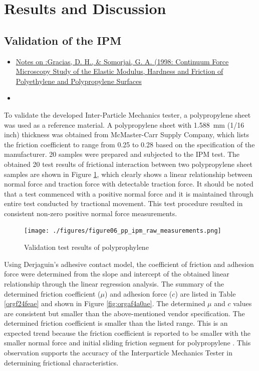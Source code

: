 \documentclass[xcolor=dvipsnames,10pt,hidelinks]{article}
\let\oldsubsection\subsection
\renewcommand{\subsection}{\clearpage\oldsubsection}
\begin{document}
\section{Results and Discussion}
\label{sec:orgdabf9c7}
\subsection{Validation of the IPM}
\label{sec:orga44eba8}
\begin{itemize}
\item \parencite{gracias_continuum_1998}\href{../../../../../org/mindmap/gracias_continuum_1998.org}{Notes on :Gracias, D. H., \& Somorjai, G. A. (1998: Continuum Force Microscopy Study of the Elastic Modulus, Hardness and Friction of Polyethylene and Polypropylene Surfaces}
\item 
\end{itemize}

To validate the developed Inter-Particle Mechanics tester, a polypropylene sheet was used as a reference material.
A polypropylene sheet with \qty{1.588}{\milli\meter} (1/16 inch) thickness was obtained from McMaster-Carr Supply Company,
which lists the friction coefficient to range from 0.25 to 0.28 based on the specification of the manufacturer.
20 samples were prepared and subjected to the IPM test.
The obtained 20 test results of frictional interaction between two polypropylene sheet samples are shown in Figure \ref{fig:org810e84b},
which clearly shows a linear relationship between normal force and traction force with detectable traction force.
It should be noted that a test commenced with a positive normal force and it is maintained through entire test conducted by tractional movement.
This test procedure resulted in consistent non-zero positive normal force measurements.

\begin{figure}[htbp]
\centering
\texttt{[image: ./figures/figure06\_pp\_ipm\_raw\_measurements.png]}
\caption{\label{fig:org810e84b}Validation test results of polyprophylene}
\end{figure}

Using Derjaguin’s adhesive contact model,
the coefficient of friction and adhesion force were determined from the slope and intercept of the obtained linear relationship through the linear regression analysis. The summary of the determined friction coefficient (\(\mu\)) and adhesion force (\(c\)) are listed in Table \ref{orgf24feae} and shown in Figure \ref{fig:orgaf4a0ae}.
The determined \(\mu\) and \(c\) values are consistent but smaller than the above-mentioned vendor specification.
The determined friction coefficient is smaller than the listed range.
This is an expected trend because the friction coefficient is reported to be smaller with the smaller normal force and initial sliding friction segment for polypropylene \parencite{gracias_continuum_1998,sedlak_effect_2017}.
This observation supports the accuracy of the Interparticle Mechanics Tester in determining frictional characteristics.
\end{document}
